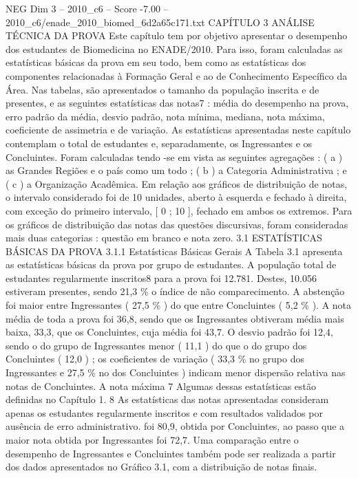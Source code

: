 \begin{textsample}{NEG Dim 3 – 2010\_c6 – Score -7.00 – 2010\_c6/enade\_2010\_biomed\_6d2a65c171.txt}  \label{ex:f3_neg_015}
CAPÍTULO 3 ANÁLISE TÉCNICA DA PROVA Este capítulo tem por objetivo apresentar o desempenho dos estudantes de Biomedicina no ENADE/2010.
Para isso, foram calculadas as estatísticas básicas da prova em seu todo, bem como as estatísticas dos componentes relacionadas à Formação Geral e ao de Conhecimento Específico da Área.
Nas tabelas, são apresentados o tamanho da população inscrita e de presentes, e as seguintes estatísticas das notas7 : média do desempenho na prova, erro padrão da média, desvio padrão, nota mínima, mediana, nota máxima, coeficiente de assimetria e de variação.
As estatísticas apresentadas neste capítulo contemplam o total de estudantes e, separadamente, os Ingressantes e os Concluintes.
Foram calculadas tendo -se em vista as seguintes agregações : ( a ) as Grandes Regiões e o país como um todo ; ( b ) a Categoria Administrativa ; e ( c ) a Organização Acadêmica.
Em relação aos gráficos de distribuição de notas, o intervalo considerado foi de 10 unidades, aberto à esquerda e fechado à direita, com exceção do primeiro intervalo, [ 0 ; 10 ], fechado em ambos os extremos.
Para os gráficos de distribuição das notas das questões discursivas, foram consideradas mais duas categorias : questão em branco e nota zero. 3.1 ESTATÍSTICAS BÁSICAS DA PROVA 3.1.1 Estatísticas Básicas Gerais A Tabela 3.1 apresenta as estatísticas básicas da prova por grupo de estudantes.
A população total de estudantes regularmente inscritos8 para a prova foi 12.781.
Destes, 10.056 estiveram presentes, sendo 21,3 \% o índice de não comparecimento.
A abstenção foi maior entre Ingressantes ( 27,5 \% ) do que entre Concluintes ( 5,2 \% ).
A nota média de toda a prova foi 36,8, sendo que os Ingressantes obtiveram média mais baixa, 33,3, que os Concluintes, cuja média foi 43,7.
O desvio padrão foi 12,4, sendo o do grupo de Ingressantes menor ( 11,1 ) do que o do grupo dos Concluintes ( 12,0 ) ; os coeficientes de variação ( 33,3 \% no grupo dos Ingressantes e 27,5 \% no dos Concluintes ) indicam menor dispersão relativa nas notas de Concluintes.
A nota máxima 7 Algumas dessas estatísticas estão definidas no Capítulo 1. 8 As estatísticas das notas apresentadas consideram apenas os estudantes regularmente inscritos e com resultados validados por ausência de erro administrativo. foi 80,9, obtida por Concluintes, ao passo que a maior nota obtida por Ingressantes foi 72,7.
Uma comparação entre o desempenho de Ingressantes e Concluintes também pode ser realizada a partir dos dados apresentados no Gráfico 3.1, com a distribuição de notas finais.

\end{textsample}

